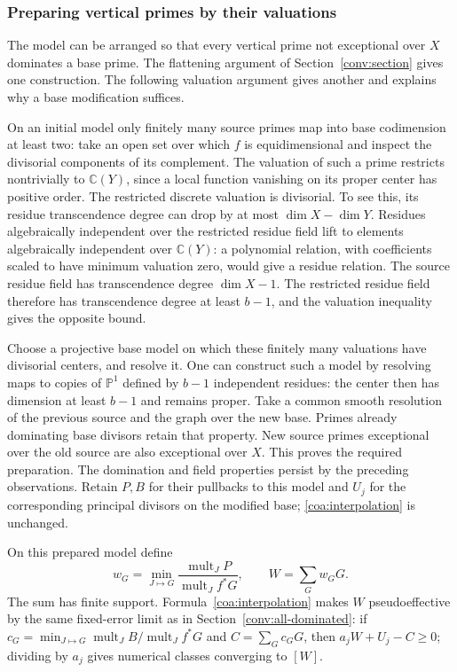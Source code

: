 \subsubsection*{Preparing vertical primes by their valuations}

The model can be arranged so that every vertical prime not exceptional
over $X$ dominates a base prime.  The flattening argument of
Section~\ref{conv:section} gives one construction.  The following
valuation argument gives another and explains why a base modification
suffices.

On an initial model only finitely many source primes map into base
codimension at least two: take an open set over which $f$ is
equidimensional and inspect the divisorial components of its
complement.  The valuation of such a prime restricts nontrivially to
$\mathbb C(Y)$, since a local function vanishing on its proper center
has positive order.  The restricted discrete valuation is divisorial.
To see this, its residue transcendence degree can drop by at most
$\dim X-\dim Y$.  Residues algebraically independent over the
restricted residue field lift to elements algebraically independent
over $\mathbb C(Y)$: a polynomial relation, with coefficients scaled
to have minimum valuation zero, would give a residue relation.
The source residue field has transcendence degree $\dim X-1$.
The restricted residue field therefore has transcendence degree at
least $b-1$, and the valuation inequality gives the opposite bound.

Choose a projective base model on which these finitely many valuations
have divisorial centers, and resolve it.  One can construct such a
model by resolving maps to copies of $\mathbb P^1$ defined by
$b-1$ independent residues: the center then has dimension at least
$b-1$ and remains proper.  Take a common smooth resolution of the
previous source and the graph over the new base.  Primes already
dominating base divisors retain that property.  New source primes
exceptional over the old source are also exceptional over $X$.
This proves the required preparation.  The domination and field
properties persist by the preceding observations.  Retain $P,B$ for
their pullbacks to this model and $U_j$ for the corresponding principal
divisors on the modified base; \eqref{coa:interpolation} is unchanged.

On this prepared model define
\begin{equation}\label{coa:minima}
 w_G=\min_{J\mapsto G}\frac{\operatorname{mult}_JP}
                              {\operatorname{mult}_Jf^*G},
 \qquad W=\sum_Gw_GG.
\end{equation}
The sum has finite support.  Formula~\eqref{coa:interpolation} makes
$W$ pseudoeffective by the same fixed-error limit as in
Section~\ref{conv:all-dominated}: if
$c_G=\min_{J\mapsto G}\operatorname{mult}_JB/
\operatorname{mult}_Jf^*G$ and $C=\sum_Gc_GG$, then
$a_jW+U_j-C\ge0$; dividing by $a_j$ gives numerical classes
converging to $[W]$.

